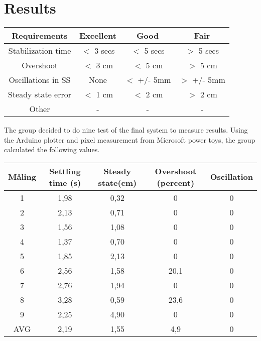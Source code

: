 \section{Results}

\begin{center}
\begin{tabular}{ |c|c|c|c|}
 \hline
 Requirements & Excellent & Good & Fair \\
 \hline
 Stabilization time & $<$ 3 secs & $<$ 5 secs & $>$ 5 secs\\ 
 \hline
 Overshoot & $<$ 3 cm & $<$ 5 cm & $>$ 5 cm \\  
 \hline
 Oscillations in SS & None & $<$ +/- 5mm & $>$ +/- 5mm \\
 \hline
 Steady state error & $<$ 1 cm & $<$ 2 cm & $>$ 2 cm \\
 \hline
 Other & - & - & - \\
 \hline
\end{tabular}
\end{center}

The group decided to do nine test of the final system to measure results. Using the Arduino plotter and pixel measurement from Microsoft power toys, the group calculated the following values.

\begin{center}
\begin{tabular}{ |c|c|c|c|c|}
\hline
Måling & Settling time (s) & Steady state(cm) & Overshoot (percent) & Oscillation\\
\hline
1 &  1,98 & 0,32 & 0 & 0\\ 
\hline
2 & 2,13 & 0,71 & 0 & 0\\  
\hline
3 &  1,56 & 1,08 & 0 & 0\\ 
\hline
4 &  1,37 & 0,70 & 0 & 0\\ 
\hline
5 &  1,85 & 2,13 & 0 & 0\\ 
\hline
6 &  2,56 & 1,58 & 20,1 & 0\\ 
\hline
7 &  2,76 & 1,94 & 0 & 0\\ 
\hline
8 &  3,28 & 0,59 & 23,6 & 0\\ 
\hline
9 &  2,25 & 4,90 & 0 & 0\\ 
\hline
AVG & 2,19 & 1,55 & 4,9 & 0 \\
\hline
\end{tabular}
\end{center}